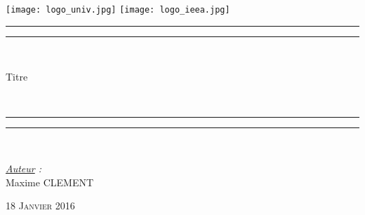 \thispagestyle{cover}

\texttt{[image: logo\_univ.jpg]}
 \hfill \texttt{[image: logo\_ieea.jpg]} \\

\vspace*{10mm}

\begin{center}

	\vspace*{10mm}


	\rule[0.5ex]{\linewidth}{2pt}\vspace*{-\baselineskip}\vspace*{3.2pt}


	\rule[0.5ex]{\linewidth}{1pt}\\[\baselineskip]

		\begin{Huge}Titre\end{Huge}\\[4mm]

	\rule[0.5ex]{\linewidth}{1pt}\vspace*{-\baselineskip}\vspace{3.2pt}
	\rule[0.5ex]{\linewidth}{2pt}\\

	\vspace*{20mm}

	{\LARGE \textit{\underline{Auteur} :}}\\
	\vspace*{3mm}
	{\LARGE Maxime CLEMENT}\\
	
	\vspace*{20mm}
	
	{\LARGE\textsc{18 Janvier 2016}}
	
\end{center}